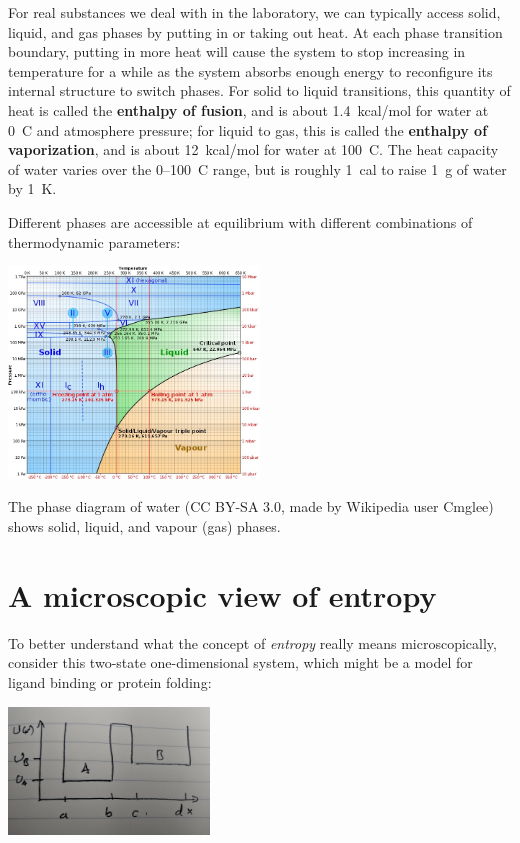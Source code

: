 \documentclass[english,course]{lecture}
\begin{document}
For real substances we deal with in the laboratory, we can typically access solid, liquid, and gas phases by putting in or taking out heat.
At each phase transition boundary, putting in more heat will cause the system to stop increasing in temperature for a while as the system absorbs enough energy to reconfigure its internal structure to switch phases.
For solid to liquid transitions, this quantity of heat is called the {\bf enthalpy of fusion}, and is about 1.4~kcal/mol for water at 0~C and atmosphere pressure; for liquid to gas, this is called the {\bf enthalpy of vaporization}, and is about 12~kcal/mol for water at 100~C.
The heat capacity of water varies over the 0--100~C range, but is roughly 1~cal to raise 1~g of water by 1~K.

Different phases are accessible at equilibrium with different combinations of thermodynamic parameters:

\begin{centering}
\includegraphics[width=0.5\textwidth]{figures/water-phase-diagram.jpg}

\end{centering}

The phase diagram of water (CC BY-SA 3.0, made by Wikipedia user Cmglee) shows solid, liquid, and vapour (gas) phases.

\section{A microscopic view of entropy}

To better understand what the concept of \emph{entropy} really means microscopically, consider this two-state one-dimensional system, which might be a model for ligand binding or protein folding:

\begin{centering}
\includegraphics[width=0.4\textwidth]{figures/two-state-model.jpg}

\end{centering}
\end{document}
